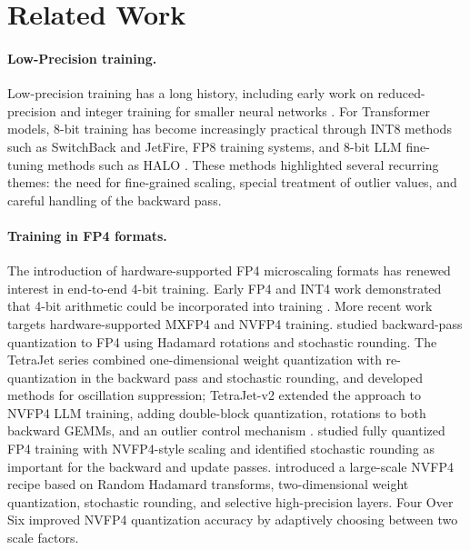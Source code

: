 \section{Related Work}

\paragraph{Low-Precision training.}
Low-precision training has a long history, including early work on reduced-precision and integer training for smaller neural networks \citep{courbariaux2015binaryconnect,banner2018scalable,yang2019training}. For Transformer models, 8-bit training has become increasingly practical through INT8 methods such as SwitchBack and JetFire, FP8 training systems, and 8-bit LLM fine-tuning methods such as HALO \citep{wortsman2023stablelowprecisiontraininglargescale, xi2024jetfireefficientaccuratetransformer, micikevicius2022fp8, deepseekai2025deepseekv3technicalreport, mishra2025recipespretrainingllmsmxfp8, ashkboos2025halohadamardassistedlowerprecisionoptimization}. These methods highlighted several recurring themes: the need for fine-grained scaling, special treatment of outlier values, and careful handling of the backward pass.

\paragraph{Training in FP4 formats.}
The introduction of hardware-supported FP4 microscaling formats has renewed interest in end-to-end 4-bit training. Early FP4 and INT4 work demonstrated that 4-bit arithmetic could be incorporated into training \citep{xi2023trainingtransformers4bitintegers, chmiel2024accurateneuraltraining4bit, wang2025optimizinglargelanguagemodel, zhou2025efficientpretrainingexploringfp4}. More recent work targets hardware-supported MXFP4 and NVFP4 training. \citet{tseng2025mxfp4} studied backward-pass quantization to FP4 using Hadamard rotations and stochastic rounding. The TetraJet series combined one-dimensional weight quantization with re-quantization in the backward pass and stochastic rounding, and developed methods for oscillation suppression; TetraJet-v2 extended the approach to NVFP4 LLM training, adding double-block quantization, rotations to both backward GEMMs, and an outlier control mechanism \citep{chen2025oscillationreducedmxfp4trainingvision, chen2025tetrajet}. \citet{chmiel2025fp4all} studied fully quantized FP4 training with NVFP4-style scaling and identified stochastic rounding as important for the backward and update passes. \citet{nvidia2025pretraining} introduced a large-scale NVFP4 recipe based on Random Hadamard transforms, two-dimensional weight quantization, stochastic rounding, and selective high-precision layers. Four Over Six \citep{cook2025fouroversix} improved NVFP4 quantization accuracy by adaptively choosing between two scale factors.


